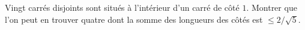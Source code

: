 Vingt carrés disjoints sont situés à l'intérieur d'un carré de côté $1$. Montrer que l'on peut en trouver quatre dont la somme des longueurs des côtés est $\leq 2/\sqrt{5}$.
